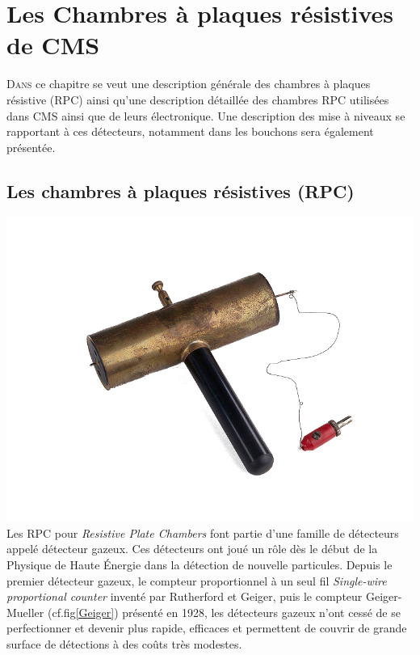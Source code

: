 \chapter{Les Chambres à plaques résistives de CMS}
\renewcommand\chapterillustration{RPC/rpc}
\ThisULCornerWallPaper{1}{\chapterillustration}
\minitoc

\lettrine[lines=4, slope=-0.5em]{D}{ans} ce chapitre se veut une description générale des chambres à plaques résistive (RPC) ainsi qu'une description détaillée des chambres RPC utilisées dans CMS ainsi que de leurs électronique. Une description des mise à niveaux se rapportant à ces détecteurs, notamment dans les bouchons sera également présentée.

\section{Les chambres à plaques résistives (RPC)}

 \marginpar
{
	\centering
	\includegraphics[width=\marginparwidth]{RPC/Geiger.png}
	\label{Geiger}
}
Les RPC pour \textit{Resistive Plate Chambers} font partie d'une famille de détecteurs appelé détecteur gazeux. Ces détecteurs ont joué un rôle dès le début de la Physique de Haute Énergie dans la détection de nouvelle particules. Depuis le premier détecteur gazeux, le compteur proportionnel à un seul fil \textit{Single-wire proportional counter} inventé par Rutherford et Geiger, puis le compteur Geiger-Mueller (cf.fig\ref{Geiger}) présenté en 1928, les détecteurs gazeux n'ont cessé de se perfectionner et devenir plus rapide, efficaces et permettent de couvrir de grande surface de détections à des coûts très modestes.


